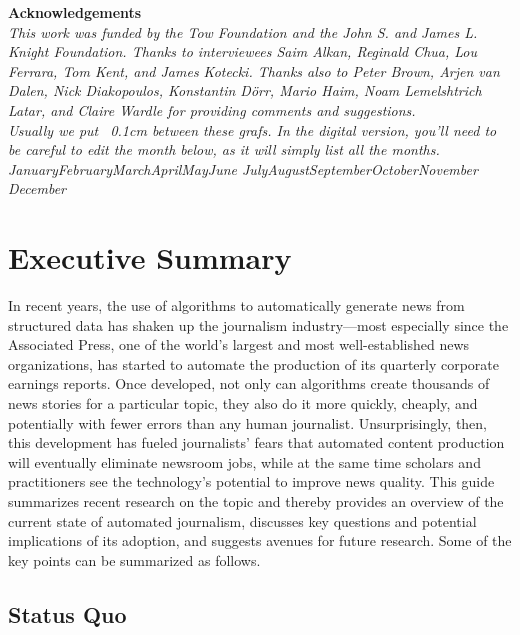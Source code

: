 \documentclass[notoc, symmetric, nobib, nols]{towcenter-guideto-book}
\newcommand{\monthyear}{%
  \ifcase\month\or January\or February\or March\or April\or May\or June\or
  July\or August\or September\or October\or November\or
  December\fi\space\number\year
}
\newcommand{\blankpage}{\newpage\hbox{}\thispagestyle{empty}\newpage}
\begin{document}
\blankpage
\blankpage


\null
\begin{fullwidth}
\noindent\textsf{\textbf{Acknowledgements}} \\[0.3cm]
\noindent\textit{This work was funded by the Tow Foundation and the John S. and James L. Knight Foundation. Thanks to interviewees Saim Alkan, Reginald Chua, Lou Ferrara, Tom Kent, and James Kotecki. Thanks also to Peter Brown, Arjen van Dalen, Nick Diakopoulos, Konstantin Dörr, Mario Haim, Noam Lemelshtrich Latar, and Claire Wardle for providing comments and suggestions.
}\\[0.1cm]\noindent\textit{
Usually we put ~0.1cm between these grafs. In the digital version, you'll need to be careful to edit the month below, as it will simply list all the months. 
}\\[0.1cm]
\noindent\textit{\monthyear}
\end{fullwidth}
\tableofcontents


\cleardoublepage


\mainmatter
\chapter{Executive Summary}

In recent years, the use of algorithms to automatically generate news from structured data has shaken up the journalism industry---most especially since the Associated Press, one of the world's largest and most well-established news organizations, has started to automate the production of its quarterly corporate earnings reports. Once developed, not only can algorithms create thousands of news stories for a particular topic, they also do it more quickly, cheaply, and potentially with fewer errors than any human journalist. Unsurprisingly, then, this development has fueled journalists' fears that automated content production will eventually eliminate newsroom jobs, while at the same time scholars and practitioners see the technology's potential to improve news quality. This guide summarizes recent research on the topic and thereby provides an overview of the current state of automated journalism, discusses key questions and potential implications of its adoption, and suggests avenues for future research. Some of the key points can be summarized as follows.

\section{Status Quo}
\end{document}
